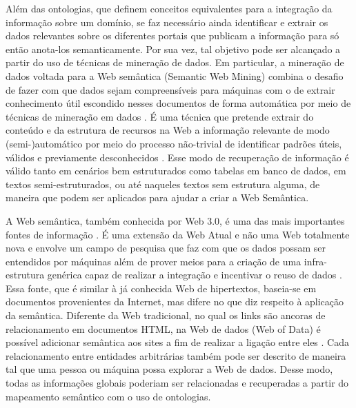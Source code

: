 Além das ontologias, que definem conceitos equivalentes para a integração da informação sobre um domínio, se faz necessário ainda identificar e extrair os dados relevantes sobre os diferentes portais que publicam a informação para só então anota-los semanticamente. Por sua vez, tal objetivo pode ser alcançado a partir do uso de técnicas de mineração de dados. Em particular, a mineração de dados voltada para a Web semântica (Semantic Web Mining) combina o desafio de fazer com que dados sejam compreensíveis para máquinas com o de extrair conhecimento útil escondido nesses documentos de forma automática por meio de técnicas de mineração em dados \citep{Stumme2006}. É uma técnica que pretende extrair do conteúdo e da estrutura de recursos na Web a informação relevante de modo (semi-)automático \citep{Stumme2006} por meio do processo não-trivial de identificar padrões úteis, válidos e previamente desconhecidos \citep{Fayyad1996}. Esse modo de recuperação de informação é válido tanto em cenários bem estruturados como tabelas em banco de dados, em textos semi-estruturados, ou até naqueles textos sem estrutura alguma, de maneira que podem ser aplicados para ajudar a criar a Web Semântica.

A Web semântica, também conhecida por Web 3.0, é uma das mais importantes fontes de informação \citep{Berners-lee2001}. É uma extensão da Web Atual e não uma Web totalmente nova \citep{Yong-gui2010} e envolve um campo de pesquisa que faz com que os dados possam ser entendidos por máquinas \citep{Stumme2006} além de prover meios para a criação de uma infra-estrutura genérica capaz de realizar a integração e incentivar o reuso de dados \citep{Bojars2008}. Essa fonte, que é similar à já conhecida Web de hipertextos, baseia-se em documentos provenientes da Internet, mas difere no que diz respeito à aplicação da semântica. Diferente da Web tradicional, no qual os links são ancoras de relacionamento em documentos HTML, na Web de dados (Web of Data) é possível adicionar semântica aos sites a fim de realizar a ligação entre eles \citep{Bojars2008}. Cada relacionamento entre entidades arbitrárias também pode ser descrito de maneira tal que uma pessoa ou máquina possa explorar a Web de dados. Desse modo, todas as informações globais poderiam ser relacionadas e recuperadas a partir do mapeamento semântico com o uso de ontologias.

